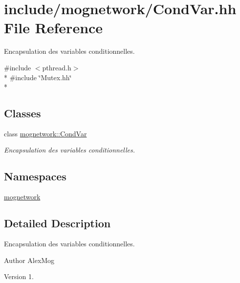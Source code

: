 \hypertarget{_cond_var_8hh}{\section{include/mognetwork/\-Cond\-Var.hh File Reference}
\label{_cond_var_8hh}
}


Encapsulation des variables conditionnelles.  


{\ttfamily \#include $<$pthread.\-h$>$}\\*
{\ttfamily \#include \char`\"{}Mutex.\-hh\char`\"{}}\\*
\subsection*{Classes}
\begin{DoxyCompactItemize}
\item 
class \hyperlink{classmognetwork_1_1_cond_var}{mognetwork\-::\-Cond\-Var}
\begin{DoxyCompactList}\small\item\em Encapsulation des variables conditionnelles. \end{DoxyCompactList}\end{DoxyCompactItemize}
\subsection*{Namespaces}
\begin{DoxyCompactItemize}
\item 
\hyperlink{namespacemognetwork}{mognetwork}
\end{DoxyCompactItemize}


\subsection{Detailed Description}
Encapsulation des variables conditionnelles. \begin{DoxyAuthor}{Author}
Alex\-Mog 
\end{DoxyAuthor}
\begin{DoxyVersion}{Version}
1. 
\end{DoxyVersion}
